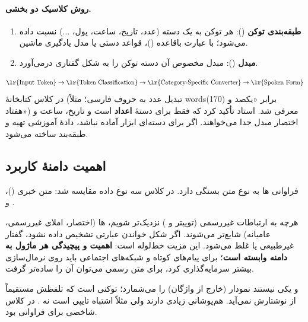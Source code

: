 \paragraph{روش کلاسیک دو بخشی.}
\begin{enumerate}
  \item \textbf{طبقه‌بندی توکن} (): هر توکن به یک دسته (عدد، تاریخ، ساعت، پول، ...) نسبت داده می‌شود؛ با عبارت باقاعده ()، قواعد دستی یا مدل یادگیری ماشین.
  \item \textbf{مبدل} (): مبدل مخصوص آن دسته توکن را به شکل گفتاری درمی‌آورد.
\end{enumerate}
\[
\text{\lr{Input Token}} \to \text{\lr{Token Classification}} \to \text{\lr{Category-Specific Converter}} \to \text{\lr{Spoken Form}}
\]
در کلاس کتابخانهٔ  (تبدیل عدد به حروف فارسی؛ مثلاً words(170) برابر «یکصد و هفتاد») معرفی شد. استاد تأکید کرد که فقط برای دستهٔ \textbf{اعداد} است و تاریخ، ساعت و اختصار مبدل جدا می‌خواهند. اگر برای دسته‌ای ابزار آماده نباشد، دادهٔ آموزشی تهیه و طبقه‌بند ساخته می‌شود.

\subsection{اهمیت دامنهٔ کاربرد}
فراوانی ها به نوع متن بستگی دارد. در کلاس سه نوع داده مقایسه شد: متن خبری ()،  و .


هرچه به ارتباطات غیررسمی (توییتر و ) نزدیک‌تر شویم، ها (اختصار، املای غیررسمی، عامیانه) شایع‌تر می‌شوند. اگر شکل خواندن عبارتی تشخیص داده نشود، گفتار غیرطبیعی یا غلط می‌شود. این مزیت خط‌لوله است: \textbf{اهمیت و پیچیدگی هر ماژول به دامنه وابسته است}؛ برای پیام‌های کوتاه و شبکه‌های اجتماعی باید روی نرمال‌سازی بیشتر سرمایه‌گذاری کرد، برای متن رسمی می‌توان آن را ساده‌تر گرفت.

\begin{correctionbox}{ و  یکی نیستند}
نمودار  (خارج از واژگان) را می‌شمارد؛  توکنی است که تلفظش مستقیماً از نوشتارش نمی‌آید. هم‌پوشانی زیادی دارند ولی مثلاً اشتباه تایپی  است نه . در کلاس  شاخصی برای فراوانی  بود.
\end{correctionbox}

